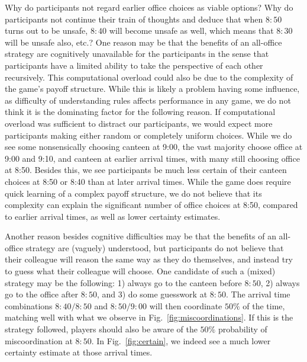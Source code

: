 \documentclass[twocolumn,a4paper,superscriptaddress,nofootinbib]{revtex4}
\begin{document}
Why do participants not regard earlier office choices as viable options? Why do participants not continue their train of thoughts and deduce that when $8{:}50$ turns out to be unsafe, $8{:}40$ will become unsafe as well, which means that $8{:}30$ will be unsafe also, etc.? One reason may be that the benefits of an all-office strategy are cognitively unavailable for the participants in the sense that participants have a limited ability to take the perspective of each other recursively. This computational overload could also be due to the complexity of the game's payoff structure. While this is likely a problem having some influence, as difficulty of understanding rules affects performance in any game, we do not think it is the dominating factor for the following reason. If computational overload was sufficient to distract our participants, we would expect more participants making either random or completely uniform choices. While we do see some nonsensically choosing canteen at 9:00, the vast majority choose office at 9:00 and 9:10, and canteen at earlier arrival times, with many still choosing office at 8:50. Besides this, we see participants be much less certain of their canteen choices at 8:50 or 8:40 than at later arrival times. While the game does require quick learning of a complex payoff structure, we do not believe that its complexity can explain the significant number of office choices at 8:50, compared to earlier arrival times, as well as lower certainty estimates. 

Another reason besides cognitive difficulties may be that the benefits of an all-office strategy are (vaguely) understood, but participants do not believe that their colleague will reason the same way as they do themselves, and instead try to guess what their colleague will choose. One candidate of such a (mixed) strategy may be the following: 1) always go to the canteen before $8{:}50$, 2) always go to the office after $8{:}50$, and 3) do some guesswork at $8{:}50$. The arrival time combinations $8{:}40/8{:}50$ and $8{:}50/9{:}00$ will then coordinate $50\%$ of the time, matching well with what we observe in Fig.~\ref{fig:miscoordinations}. If this is the strategy followed, players should also be aware of the $50\%$ probability of miscoordination at $8{:}50$. In Fig.~\ref{fig:certain}, we indeed see a much lower certainty estimate at those arrival times.
\end{document}
